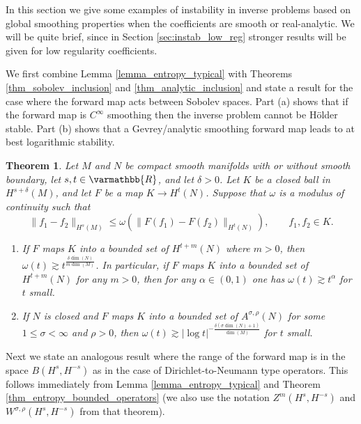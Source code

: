 \documentclass[12pt,twoside]{amsart}
\numberwithin{equation}{section}
\renewcommand{\leq}{\leqslant}
\renewcommand{\mathbb}{\varmathbb}
\newtheorem{theorem}{Theorem}[section]
\newcommand{\mR}{\mathbb{R}}                    %
\newcommand{\abs}[1]{\lvert #1 \rvert}          %
\newcommand{\norm}[1]{\lVert #1 \rVert}         %
\begin{document}
In this section we give some examples of instability in inverse problems based on global smoothing properties when the coefficients are smooth or real-analytic. We will be quite brief, since in Section \ref{sec:instab_low_reg} stronger results will be given for low regularity coefficients.


We first combine Lemma \ref{lemma_entropy_typical} with Theorems \ref{thm_sobolev_inclusion} and \ref{thm_analytic_inclusion} and state a result for the case where the forward map acts between Sobolev spaces. Part (a) shows that if the forward map is $C^{\infty}$ smoothing then the inverse problem cannot be H\"older stable. Part (b) shows that a Gevrey/analytic smoothing forward map leads to at best logarithmic stability.

\begin{theorem} \label{thm_smoothing_instability_sobolev}
Let $M$ and $N$ be compact smooth manifolds with or without smooth boundary, let $s, t \in \mR$, and let $\delta > 0$. Let $K$ be a closed ball in $H^{s+\delta}(M)$, and let $F$ be a map $K \to H^t(N)$. Suppose that $\omega$ is a modulus of continuity such that 
\[
\norm{f_1-f_2}_{H^s(M)} \leq \omega(\norm{F(f_1) - F(f_2)}_{H^t(N)}), \qquad f_1, f_2 \in K.
\]
\begin{enumerate}
\item[(a)] 
  If $F$ maps $K$ into a bounded set of $H^{t+m}(N)$ where $m>0$, then $\omega(t) \gtrsim t^{\frac{\delta \dim(N)}{m \dim(M)}}$. In particular, if $F$ maps $K$ into a bounded set of $H^{t+m}(N)$ for any $m > 0$, then for any $\alpha \in (0,1)$ one has $\omega(t) \gtrsim t^{\alpha}$ for $t$ small.
\item[(b)] 
If $N$ is closed and $F$ maps $K$ into a bounded set of $A^{\sigma,\rho}(N)$ for some $1 \leq \sigma < \infty$ and $\rho > 0$, then $\omega(t) \gtrsim \abs{\log t}^{-\frac{\delta(\sigma \dim(N) +1)}{\dim(M)}}$ for $t$ small.
\end{enumerate}
\end{theorem}

Next we state an analogous result where the range of the forward map is in the space $B(H^s, H^{-s})$ as in the case of Dirichlet-to-Neumann type operators. This follows immediately from Lemma \ref{lemma_entropy_typical} and Theorem \ref{thm_entropy_bounded_operators} (we also use the notation $Z^m(H^s,H^{-s})$ and $W^{\sigma,\rho}(H^s, H^{-s})$ from that theorem).
\end{document}

